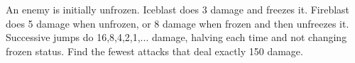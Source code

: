 An enemy is initially unfrozen. Iceblast does 3 damage and freezes it. Fireblast does 5 damage when unfrozen, or 8 damage when frozen and then unfreezes it. Successive jumps do 16,8,4,2,1,... damage, halving each time and not changing frozen status. Find the fewest attacks that deal exactly 150 damage.
